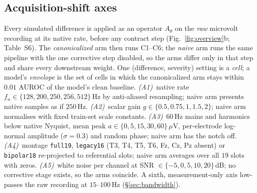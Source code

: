 \documentclass[conference]{IEEEtran}
\begin{document}
\subsection{Acquisition-shift axes}
\label{sec:shift_model}
Every simulated difference is applied as an operator $A_\theta$ on
the \emph{raw} microvolt recording at its native rate, before any
contract step (Fig.~\ref{fig:overview}b; Table~S6). The
\emph{canonicalized} arm then runs C1--C6; the \emph{naive} arm runs
the same pipeline with the one corrective step disabled, so the arms
differ only in that step and share every downstream weight. One
(difference, severity) setting is a \emph{cell}; a model's
\emph{envelope} is the set of cells in which the canonicalized arm
stays within $0.01$ AUROC of the model's clean baseline. \emph{(A1)}~native rate $f_n \in \{128, 200, 250,
256, 512\}$\,Hz by anti-aliased resampling; naive arm presents native
samples as if $250$\,Hz. \emph{(A2)}~scalar gain $g \in \{0.5, 0.75, 1,
1.5, 2\}$; naive arm normalises with fixed train-set scale constants.
\emph{(A3)}~$60$\,Hz mains and harmonics below native Nyquist, mean
peak $a \in \{0, 5, 15, 30, 60\}\,\mu$V, per-electrode log-normal
amplitude ($\sigma{=}0.3$) and random phase; naive arm has the notch
off. \emph{(A4)}~montage \texttt{full19}, \texttt{legacy16} (T3, T4,
T5, T6, Fz, Cz, Pz absent) or \texttt{bipolar18} re-projected to
referential slots; naive arm averages over all $19$ slots with zeros.
\emph{(A5)}~white noise per channel at SNR $\in \{-5, 0, 5, 10,
20\}$\,dB; no corrective stage exists, so the arms coincide. A sixth,
measurement-only axis low-passes the raw recording at $15$--$100$\,Hz
(\S\ref{sec:bandwidth}).
\end{document}
